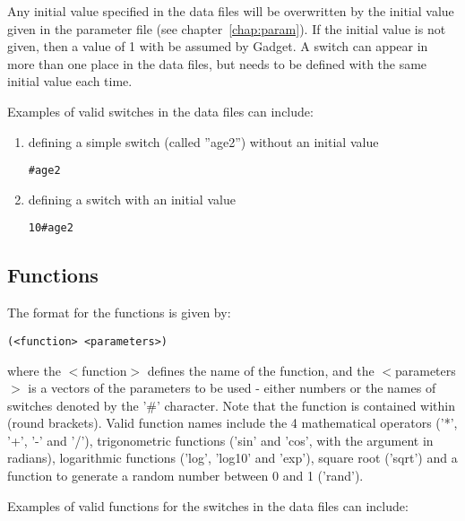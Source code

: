 \documentclass[10pt,twoside]{book}
\begin{document}
\bigskip
Any initial value specified in the data files will be overwritten by the initial value given in the parameter file (see chapter~\ref{chap:param}).  If the initial value is not given, then a value of 1 with be assumed by Gadget.  A switch can appear in more than one place in the data files, but needs to be defined with the same initial value each time.

\bigskip
Examples of valid switches in the data files can include:

\begin{enumerate}
\item defining a simple switch (called ''age2'') without an initial value
{\small\begin{verbatim}
#age2
\end{verbatim}}
\item defining a switch with an initial value
{\small\begin{verbatim}
10#age2
\end{verbatim}}
\end{enumerate}

\subsection{Functions}
The format for the functions is given by:

{\small\begin{verbatim}
(<function> <parameters>)
\end{verbatim}}

where the $<$function$>$ defines the name of the function, and the $<$parameters$>$ is a vectors of the parameters to be used - either numbers or the names of switches denoted by the '\#' character.  Note that the function is contained within (round brackets).  Valid function names include the 4 mathematical operators ('*', '+', '-' and '/'), trigonometric functions ('sin' and 'cos', with the argument in radians), logarithmic functions ('log', 'log10' and 'exp'), square root ('sqrt') and a function to generate a random number between 0 and 1 ('rand').

\bigskip
Examples of valid functions for the switches in the data files can include:
\end{document}
